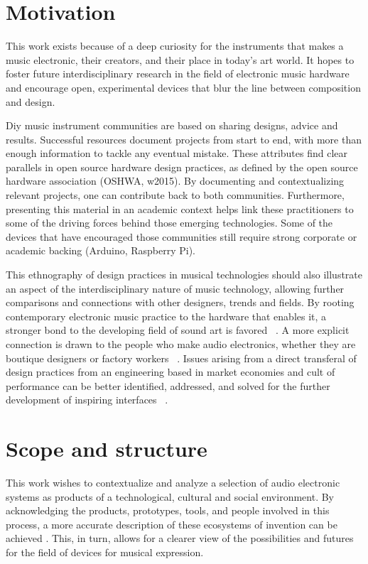 \section{Motivation}

This work exists because of a deep curiosity for the instruments that makes a music electronic, their creators, and their place in today's art world. It hopes to foster future interdisciplinary research in the field of electronic music hardware and encourage open, experimental devices that blur the line between composition and design. 

Diy music instrument communities are based on sharing designs, advice and results. Successful resources document projects from start to end, with more than enough information to tackle any eventual mistake. These attributes find clear parallels in open source hardware design practices, as defined by the open source hardware association (OSHWA, w2015). By documenting and contextualizing relevant projects, one can contribute back to both communities. Furthermore, presenting this material in an academic context helps link these practitioners to some of the driving forces behind those emerging technologies. Some of the devices that have encouraged those communities still require strong corporate or academic backing (Arduino, Raspberry Pi). 

This ethnography of design practices in musical technologies should also illustrate an aspect of the interdisciplinary nature of music technology, allowing further comparisons and connections with other designers, trends and fields. By rooting contemporary electronic music practice to the hardware that enables it, a stronger bond to the developing field of sound art is favored ~\cite{cluett2013}. A more explicit connection is drawn to the people who make audio electronics, whether they are boutique designers or factory workers ~\cite{rylan2015}.  Issues arising from a direct transferal of design practices from an engineering based in market economies and cult of performance can be better identified, addressed, and solved for the further development of inspiring interfaces ~\cite{ghazala2004,christensen2005,Feldman2007,silver2009,perner2011,hertz2012,riis2013,jackson2014}.

\section{Scope and structure}

This work wishes to contextualize and analyze a selection of audio electronic systems as products of a technological, cultural and social environment. By acknowledging the products, prototypes, tools, and people involved in this process, a more accurate description of these ecosystems of invention can be achieved \cite{vinck2003}. This, in turn, allows for a clearer view of the possibilities and futures for the field of devices for musical expression. 
	
